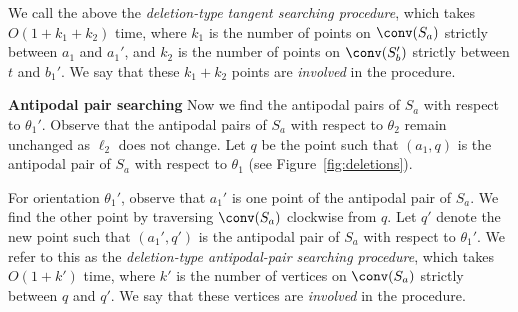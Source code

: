 


We call the above the \emph{deletion-type tangent searching procedure}, which takes $O(1+k_1+k_2)$ time, where $k_1$ is the number of points on $\conv(S_a)$ strictly between $a_1$ and $a_1'$, and $k_2$ is the number of points on $\conv(S_b')$ strictly between $t$ and $b_1'$. 
We say that these $k_1 + k_2$ points are \emph{involved} in the procedure.


    



\textbf{Antipodal pair searching}
Now we find the antipodal pairs of $S_a$ with respect to $\theta_1'$. Observe that the antipodal pairs of $S_a$ with respect to $\theta_2$  remain unchanged as $\ell_2$ does not change.
Let $q$ be the point such that $(a_1, q)$ is the antipodal pair of $S_a$ with respect to $\theta_1$ (see Figure~\ref{fig:deletions}).


For orientation $\theta_1'$, observe that $a_1'$ is one point of the antipodal pair of $S_a$. 
We find the other point by traversing $\conv(S_a)$ clockwise from $q$. 
Let $q'$ denote the new point such that $(a_1', q')$ is the antipodal pair of $S_a$ with respect to $\theta_1'$. 
We refer to this as the \emph{deletion-type antipodal-pair searching procedure}, which takes $O(1 + k')$ time, where $k'$ is the number of vertices on $\conv(S_a)$ strictly between $q$ and $q'$.
We say that these vertices are \emph{involved} in the procedure.


